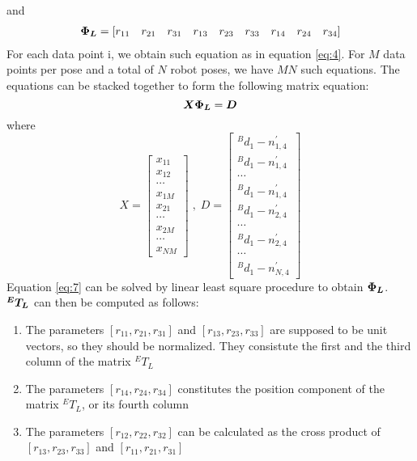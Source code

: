 and
\begin{multline}
  \vb*{\Phi_L} = \left[r_{11} \quad r_{21} \quad r_{31} \quad r_{13} \quad r_{23} \quad r_{33} \quad r_{14} \quad r_{24}  \quad r_{34} \right] 
\end{multline}
For each data point i, we obtain such equation as in equation \ref{eq:4}. For $M$ data points per pose and a total of $N$ robot poses, we have $MN$ such equations. The equations can be stacked together to form the following matrix equation:
\begin{equation}
\label{eq:7}
  \vb*{X}   \vb*{\Phi_L} = \vb*{D}
\end{equation}
where 
\begin{equation}
X =\begin{bmatrix}
x_{11} \\ x_{12} \\ \cdots\\x_{1M}\\ x_{21}\\ \cdots\\ x_{2M} \\ \cdots \\ x_{NM}
\end{bmatrix} \;, \; D =\begin{bmatrix}
{^B}d_1 -  n^{'}_{1,4} \\ {^B}d_1 -  n^{'}_{1,4}  \\ \cdots\\ {^B}d_1 -  n^{'}_{1,4}  \\ {^B}d_1 -  n^{'}_{2,4} \\ \cdots\\ {^B}d_1 -  n^{'}_{2,4}  \\ \cdots \\{^B}d_1 -  n^{'}_{N,4} 
\end{bmatrix}
\end{equation}
Equation \ref{eq:7} can be solved by linear least square procedure to obtain $\vb*{\Phi_L}$. $\vb*{{^E}T_L}$ can then be computed as follows:
\begin{enumerate}
\item The parameters $[r_{11}, r_{21}, r_{31}]$ and $[r_{13}, r_{23}, r_{33}]$ are supposed to be unit vectors, so they should be normalized. They consistute the first and the third column of the matrix ${^E}T_L$
\item The parameters $[r_{14}, r_{24}, r_{34}]$ constitutes the position component of the matrix ${^E}T_L$, or its fourth column
\item The parameters $[r_{12}, r_{22}, r_{32}]$ can be calculated as the cross product of  $[r_{13}, r_{23}, r_{33}]$ and $[r_{11}, r_{21}, r_{31}]$ 
\end{enumerate}

